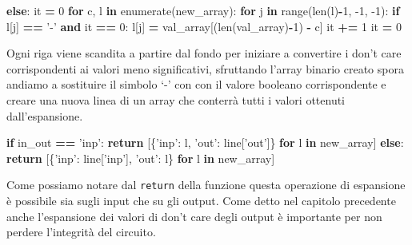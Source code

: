 \documentclass[italian,]{book}
\newenvironment{Shaded}{\begin{snugshade}}{\end{snugshade}}
\newcommand{\BuiltInTok}[1]{#1}
\newcommand{\ControlFlowTok}[1]{\textcolor[rgb]{0.13,0.29,0.53}{\textbf{#1}}}
\newcommand{\DecValTok}[1]{\textcolor[rgb]{0.00,0.00,0.81}{#1}}
\newcommand{\KeywordTok}[1]{\textcolor[rgb]{0.13,0.29,0.53}{\textbf{#1}}}
\newcommand{\NormalTok}[1]{#1}
\newcommand{\OperatorTok}[1]{\textcolor[rgb]{0.81,0.36,0.00}{\textbf{#1}}}
\newcommand{\StringTok}[1]{\textcolor[rgb]{0.31,0.60,0.02}{#1}}
\begin{document}
\begin{Shaded}
\begin{Highlighting}[]
\ControlFlowTok{else}\NormalTok{:}
\NormalTok{  it }\OperatorTok{=} \DecValTok{0}
  \ControlFlowTok{for}\NormalTok{ c, l }\KeywordTok{in} \BuiltInTok{enumerate}\NormalTok{(new_array):}
    \ControlFlowTok{for}\NormalTok{ j }\KeywordTok{in} \BuiltInTok{range}\NormalTok{(}\BuiltInTok{len}\NormalTok{(l)}\OperatorTok{-}\DecValTok{1}\NormalTok{, }\DecValTok{-1}\NormalTok{, }\DecValTok{-1}\NormalTok{):}
      \ControlFlowTok{if}\NormalTok{ l[j] }\OperatorTok{==} \StringTok{'-'} \KeywordTok{and}\NormalTok{ it }\OperatorTok{==} \DecValTok{0}\NormalTok{:}
\NormalTok{        l[j] }\OperatorTok{=}\NormalTok{ val_array[(}\BuiltInTok{len}\NormalTok{(val_array)}\OperatorTok{-}\DecValTok{1}\NormalTok{) }\OperatorTok{-}\NormalTok{ c]}
\NormalTok{        it }\OperatorTok{+=} \DecValTok{1}
\NormalTok{    it }\OperatorTok{=} \DecValTok{0}
\end{Highlighting}
\end{Shaded}

Ogni riga viene scandita a partire dal fondo per iniziare a convertire i don't care corrispondenti ai valori meno significativi, sfruttando l'array binario creato spora andiamo a sostituire il simbolo `-' con con il valore booleano corrispondente e creare una nuova linea di un array che conterrà tutti i valori ottenuti dall'espansione.

\newpage

\begin{Shaded}
\begin{Highlighting}[]
\ControlFlowTok{if}\NormalTok{ in_out }\OperatorTok{==} \StringTok{'inp'}\NormalTok{:}
  \ControlFlowTok{return}\NormalTok{ [\{}\StringTok{'inp'}\NormalTok{:  l, }\StringTok{'out'}\NormalTok{:  line[}\StringTok{'out'}\NormalTok{]\} }\ControlFlowTok{for}\NormalTok{ l }\KeywordTok{in}\NormalTok{ new_array]}
\ControlFlowTok{else}\NormalTok{:}
  \ControlFlowTok{return}\NormalTok{ [\{}\StringTok{'inp'}\NormalTok{:  line[}\StringTok{'inp'}\NormalTok{], }\StringTok{'out'}\NormalTok{:  l\} }\ControlFlowTok{for}\NormalTok{ l }\KeywordTok{in}\NormalTok{ new_array]}
\end{Highlighting}
\end{Shaded}

Come possiamo notare dal \texttt{return} della funzione questa operazione di espansione è possibile sia sugli input che su gli output. Come detto nel capitolo precedente anche l'espansione dei valori di don't care degli output è importante per non perdere l'integrità del circuito.
\end{document}
